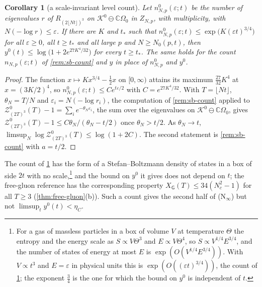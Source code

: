 \documentclass[11pt,a4paper]{amsart}
\newtheorem{corollary}[theorem]{Corollary}
\theoremstyle{definition}
\theoremstyle{remark}
\numberwithin{equation}{section}
\newcommand{\C}{\mathbb{C}}          %
\newcommand{\Kspace}{\mathcal{K}}    %
\newcommand{\TT}{\mathbb{T}}               %
\newcommand{\Zc}{\mathcal{Z}}              %
\newcommand{\cube}[1]{(2#1)^3}             %
\newcommand{\Omegazero}{\Omega_0}          %
\newcommand{\Gharm}{\mathsf{G}}            %
\begin{document}
\begin{corollary}[a scale-invariant level count]\label{cor:sb-scale-invariant}
Let $n^0_{N,p}(\varepsilon;t)$ be the number of eigenvalues $r$ of $R_{\cube{\lfloor Nt\rfloor}}$ on $\Kspace^0\ominus\C\Omegazero$ in $Z_{N,p}$, with multiplicity, with $N(-\log r)\le\varepsilon$. If there are $K$ and $t_*$ such that $n^0_{N,p}(\varepsilon;t)\le\exp\bigl(K(\varepsilon t)^{3/4}\bigr)$ for all $\varepsilon\ge0$, all $t\ge t_*$ and all large $p$ and $N\ge N_0(p,t)$, then $y^0(t)\le\log\bigl(1+2e^{27K^4/32}\bigr)$ for every $t\ge t_*$. The same holds for the count $n_{N,p}(\varepsilon;t)$ of \cref{rem:sb-count} and $y$ in place of $n^0_{N,p}$ and $y^0$.
\end{corollary}

\begin{proof}
The function $x\mapsto Kx^{3/4}-\frac12x$ on $[0,\infty)$ attains its maximum $\frac{27}{32}K^4$ at $x=(3K/2)^4$, so $n^0_{N,p}(\varepsilon;t)\le Ce^{t\varepsilon/2}$ with $C=e^{27K^4/32}$. With $T=\lfloor Nt\rfloor$, $\theta_N=T/N$ and $\varepsilon_i=N(-\log r_i)$, the computation of \cref{rem:sb-count} applied to $\Zc^0_{\cube T}(T)-1=\sum_ie^{-\theta_N\varepsilon_i}$, the sum over the eigenvalues on $\Kspace^0\ominus\C\Omegazero$, gives $\Zc^0_{\cube T}(T)-1\le C\theta_N/(\theta_N-t/2)$ once $\theta_N>t/2$. As $\theta_N\to t$, $\limsup_N\log\Zc^0_{\cube T}(T)\le\log(1+2C)$. The second statement is \cref{rem:sb-count} with $a=t/2$.
\end{proof}

The count of \cref{cor:sb-scale-invariant} has the form of a Stefan--Boltzmann density of states in a box of side $2t$ with no scale,\footnote{For a gas of massless particles in a box of volume $V$ at temperature $\Theta$ the entropy and the energy scale as $S\propto V\Theta^3$ and $E\propto V\Theta^4$, so $S\propto V^{1/4}E^{3/4}$, and the number of states of energy at most $E$ is $\exp(O(V^{1/4}E^{3/4}))$. With $V\propto t^3$ and $E=\varepsilon$ in physical units this is $\exp(O((\varepsilon t)^{3/4}))$, the count of \cref{cor:sb-scale-invariant}; the exponent $\frac34$ is the one for which the bound on $y^0$ is independent of $t$.} and the bound on $y^0$ it gives does not depend on $t$; the free-gluon reference has the corresponding property $X_\Gharm(T)\le34(N_c^2-1)$ for all $T\ge3$ (\cref{thm:free-gluon}\textup{(b)}). Such a count gives the second half of \textup{(N$_\infty$)} but not $\limsup_ty^0(t)<\eta_C$.
\end{document}
